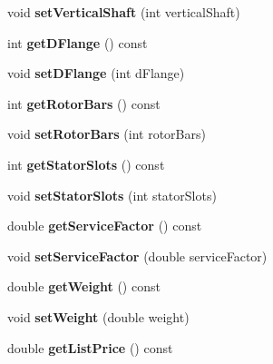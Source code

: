 \begin{DoxyCompactItemize}
void {\bfseries set\+Vertical\+Shaft} (int vertical\+Shaft)
\item 
\mbox{\label{class_motor_data_a2273d76165ea25713fa0f558d12cf502}} 
int {\bfseries get\+D\+Flange} () const
\item 
\mbox{\label{class_motor_data_a311e514d5e2ffef3686fd13be419a709}} 
void {\bfseries set\+D\+Flange} (int d\+Flange)
\item 
\mbox{\label{class_motor_data_a4cb342d2f3c4c1052fd20dc242a3bc25}} 
int {\bfseries get\+Rotor\+Bars} () const
\item 
\mbox{\label{class_motor_data_a49d255916169aeb72d1487bf641eec45}} 
void {\bfseries set\+Rotor\+Bars} (int rotor\+Bars)
\item 
\mbox{\label{class_motor_data_a3a535de88d00acc7500aa0be7104e2aa}} 
int {\bfseries get\+Stator\+Slots} () const
\item 
\mbox{\label{class_motor_data_af2abc9117562a419d707c2aebfbd6162}} 
void {\bfseries set\+Stator\+Slots} (int stator\+Slots)
\item 
\mbox{\label{class_motor_data_a5016b9883b420f0a3fd0932c80a3db1d}} 
double {\bfseries get\+Service\+Factor} () const
\item 
\mbox{\label{class_motor_data_a295821781e50c9ab969a0c4987fe6d88}} 
void {\bfseries set\+Service\+Factor} (double service\+Factor)
\item 
\mbox{\label{class_motor_data_a12903f6e79416bffa80b217dee6cbc8c}} 
double {\bfseries get\+Weight} () const
\item 
\mbox{\label{class_motor_data_aadf0258ade287078a57493644b90c12a}} 
void {\bfseries set\+Weight} (double weight)
\item 
\mbox{\label{class_motor_data_a73b5f609b313e1b071da76f0c2430649}} 
double {\bfseries get\+List\+Price} () const
\item 
\mbox{\label{class_motor_data_addbfade0ae45f1b49554a923c819debb}} 

\end{DoxyCompactItemize}
